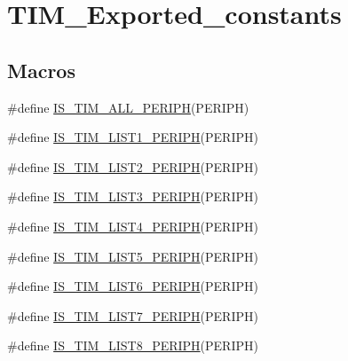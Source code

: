 \hypertarget{group___t_i_m___exported__constants}{}\section{T\+I\+M\+\_\+\+Exported\+\_\+constants}
\label{group___t_i_m___exported__constants}
\subsection*{Macros}
\begin{DoxyCompactItemize}
\item 
\#define \hyperlink{group___t_i_m___exported__constants_ga71710da28a59c007a1d2ddee18a5ffcc}{I\+S\+\_\+\+T\+I\+M\+\_\+\+A\+L\+L\+\_\+\+P\+E\+R\+I\+PH}(P\+E\+R\+I\+PH)
\item 
\#define \hyperlink{group___t_i_m___exported__constants_ga1abea04e3837b7683d8e8dc33441677f}{I\+S\+\_\+\+T\+I\+M\+\_\+\+L\+I\+S\+T1\+\_\+\+P\+E\+R\+I\+PH}(P\+E\+R\+I\+PH)
\item 
\#define \hyperlink{group___t_i_m___exported__constants_ga3c489ac3294f0d8f2ec097da909bc8e0}{I\+S\+\_\+\+T\+I\+M\+\_\+\+L\+I\+S\+T2\+\_\+\+P\+E\+R\+I\+PH}(P\+E\+R\+I\+PH)
\item 
\#define \hyperlink{group___t_i_m___exported__constants_ga2d80541c542755ac3f2aca078bd98adb}{I\+S\+\_\+\+T\+I\+M\+\_\+\+L\+I\+S\+T3\+\_\+\+P\+E\+R\+I\+PH}(P\+E\+R\+I\+PH)
\item 
\#define \hyperlink{group___t_i_m___exported__constants_ga9c2699fd3d0c0901f8ac706c3d2dfe10}{I\+S\+\_\+\+T\+I\+M\+\_\+\+L\+I\+S\+T4\+\_\+\+P\+E\+R\+I\+PH}(P\+E\+R\+I\+PH)
\item 
\#define \hyperlink{group___t_i_m___exported__constants_ga90232c3966a578fbd9be2b228f225cb4}{I\+S\+\_\+\+T\+I\+M\+\_\+\+L\+I\+S\+T5\+\_\+\+P\+E\+R\+I\+PH}(P\+E\+R\+I\+PH)
\item 
\#define \hyperlink{group___t_i_m___exported__constants_ga99fabffbddc9ca930f80a4480daeecbe}{I\+S\+\_\+\+T\+I\+M\+\_\+\+L\+I\+S\+T6\+\_\+\+P\+E\+R\+I\+PH}(P\+E\+R\+I\+PH)
\item 
\#define \hyperlink{group___t_i_m___exported__constants_ga421bba71d6e8fbe9a9d422ecd59e79be}{I\+S\+\_\+\+T\+I\+M\+\_\+\+L\+I\+S\+T7\+\_\+\+P\+E\+R\+I\+PH}(P\+E\+R\+I\+PH)
\item 
\#define \hyperlink{group___t_i_m___exported__constants_ga120d98895bd48d628028753212b68233}{I\+S\+\_\+\+T\+I\+M\+\_\+\+L\+I\+S\+T8\+\_\+\+P\+E\+R\+I\+PH}(P\+E\+R\+I\+PH)
\item 

\end{DoxyCompactItemize}
